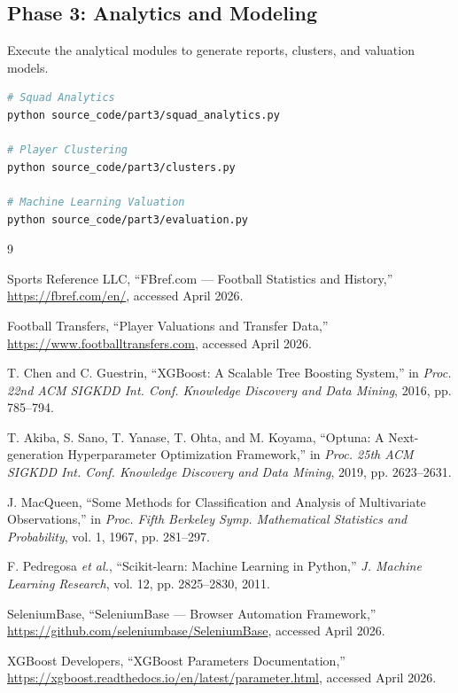 \documentclass[a4paper,12pt]{report}
\begin{document}
\subsection{Phase 3: Analytics and Modeling}
Execute the analytical modules to generate reports, clusters, and valuation models.
\begin{lstlisting}[language=bash]
# Squad Analytics
python source_code/part3/squad_analytics.py

# Player Clustering
python source_code/part3/clusters.py

# Machine Learning Valuation
python source_code/part3/evaluation.py
\end{lstlisting}


\begin{thebibliography}{9}
\raggedright

Sports Reference LLC, ``FBref.com --- Football Statistics and History,''
\url{https://fbref.com/en/}, accessed April 2026.

Football Transfers, ``Player Valuations and Transfer Data,''
\url{https://www.footballtransfers.com}, accessed April 2026.

T. Chen and C. Guestrin, ``XGBoost: A Scalable Tree Boosting System,''
in \textit{Proc. 22nd ACM SIGKDD Int. Conf. Knowledge Discovery and Data Mining}, 2016, pp. 785--794.

T. Akiba, S. Sano, T. Yanase, T. Ohta, and M. Koyama,
``Optuna: A Next-generation Hyperparameter Optimization Framework,''
in \textit{Proc. 25th ACM SIGKDD Int. Conf. Knowledge Discovery and Data Mining}, 2019, pp. 2623--2631.

J. MacQueen, ``Some Methods for Classification and Analysis of Multivariate Observations,''
in \textit{Proc. Fifth Berkeley Symp. Mathematical Statistics and Probability}, vol. 1, 1967, pp. 281--297.

F. Pedregosa \textit{et al.}, ``Scikit-learn: Machine Learning in Python,''
\textit{J. Machine Learning Research}, vol. 12, pp. 2825--2830, 2011.

SeleniumBase, ``SeleniumBase --- Browser Automation Framework,''
\url{https://github.com/seleniumbase/SeleniumBase}, accessed April 2026.

XGBoost Developers, ``XGBoost Parameters Documentation,''
\url{https://xgboost.readthedocs.io/en/latest/parameter.html}, accessed April 2026.

\end{thebibliography}
\end{document}
